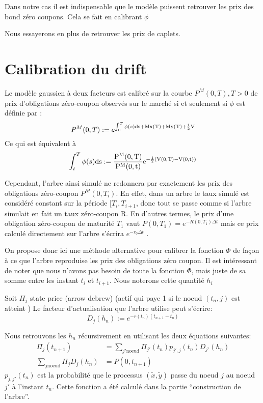 Dans notre cas il est indispensable que le modèle puissent retrouver les prix des bond zéro coupons. Cela se fait en calibrant $\phi$


Nous essayerons en plus de retrouver les prix de caplets.

\section{Calibration du drift}
Le modèle gaussien à deux facteurs est calibré sur la
courbe $P^M (0, T ), T > 0$ de prix d’obligations zéro-coupon observés sur le
marché si et seulement si $\phi$ est définie par :
$$P^M(0, T) := e^{ \int_0^T \phi(s) \rm{d}s + M x(T) +M y(T) + \frac{1}{2} V}$$
Ce qui est équivalent à 
$$ \int_t^T \phi(s) \rm{d}s := \frac{P^M(0, T)}{P^M(0, t)} e^{-\frac{1}{2}(V(0, T) - V(0, t))}$$

Cependant, l’arbre ainsi simulé ne redonnera par exactement les prix des
obligations zéro-coupon $P^M(0, T_i)$. En effet, dans un arbre le taux simulé est
considéré constant sur la période $[T_i, T_{i+1}$, donc tout se passe comme
si l’arbre simulait en fait un taux zéro-coupon R. En d’autres termes, le prix
d’une obligation zéro-coupon de maturité $T_1$ vaut
$P(0, T_1 ) = e^{-R(0, T_1) \Delta t}$
mais ce prix calculé directement sur l’arbre s’écrira $e^{-r_0\Delta t}$ .


On propose donc ici une méthode alternative pour calibrer la fonction $\Phi$ de façon à ce que l'arbre reproduise les prix des obligations zéro coupon.
Il est intéressant de noter que nous n'avons pas besoin de toute la fonction $\Phi$, mais juste de sa somme entre les instant $t_i$ et $t_{i+1}$. Nous noterons cette quantité $h_i$

Soit $\Pi_j$ state price (arrow debrew) (actif qui paye 1 si le noeud $(t_n, j)$ est atteint )
Le facteur d'actualisation que l'arbre utilise peut s'écrire:
$$D_j(h_n) := e^{- r(t_n)(t_{n+1} - t_n)} $$

Nous retrouvons les $h_n$ récursivement en utilisant les deux équations suivantes:
\begin{align}
  \Pi_j(t_{n+1}) &= \sum_{j' \text{noeud}} \Pi_{j'}(t_n) p_{j', j}(t_n) D_{j'}(h_n) \\
  \sum_{ j \text{noeud} } \Pi_j D_j(h_n) &= P(0, t_{n+1})
\end{align}
$p_{j, j'}(t_n)$ est la probabilité que le processus $(\widetilde x, \widetilde y)$ passe du noeud $j$ au noeud $j'$ à l'instant $t_n$. Cette fonction a été calculé dans la partie ``construction de l'arbre''.

